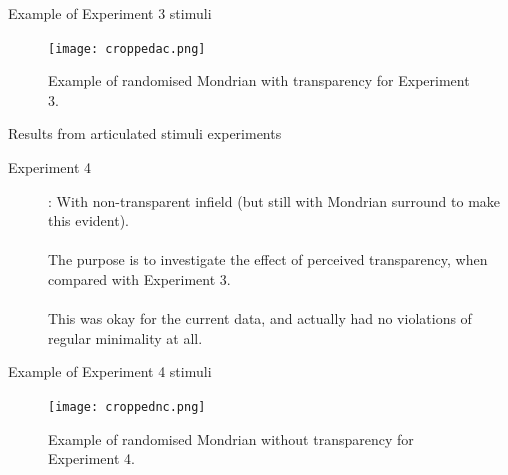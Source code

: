 \documentclass{beamer}
\begin{document}
\begin{frame}[t]{Example of Experiment 3 stimuli}
\begin{figure}[c]
\texttt{[image: croppedac.png]}
\caption{Example of randomised Mondrian with transparency for Experiment 3.}
\end{figure}
\end{frame}

\begin{frame}[t]{Results from articulated stimuli experiments}
\begin{description}
\item[Experiment 4]:  With non-transparent infield (but still with Mondrian surround to make this evident).\\
~\\

The purpose is to investigate the effect of perceived transparency, when compared with Experiment 3.\\
~\\
 This was okay for the current data, and actually had no violations of regular minimality at all.

\end{description}
\end{frame}

\begin{frame}[t]{Example of Experiment 4 stimuli}
\begin{figure}[c]
\texttt{[image: croppednc.png]}
\caption{Example of randomised Mondrian without transparency for Experiment 4.}
\end{figure}
\end{frame}
\end{document}
